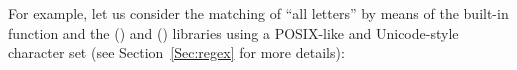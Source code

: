 \documentclass[nojss]{jss}
\begin{document}
%
%

%

%





For example, let us consider the matching
of ``all letters'' by means of the built-in  function
and the  ()
and  () libraries
using a POSIX-like and Unicode-style character set
(see Section~\ref{Sec:regex} for more details):
\end{document}
